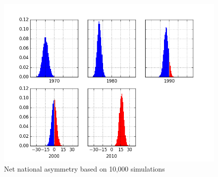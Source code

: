 \documentclass[preprint,12pt]{article}
\begin{document}
\begin{figure}[htb!]
    \begin{center}
        \includegraphics[scale=0.8]{../Figures/ExpectedAsymmetry/netAsymHist.png}
        \caption{Net national asymmetry based on 10,000 simulations}\label{fig:NetAsymHist}
    \end{center}
\end{figure}
\end{document}
